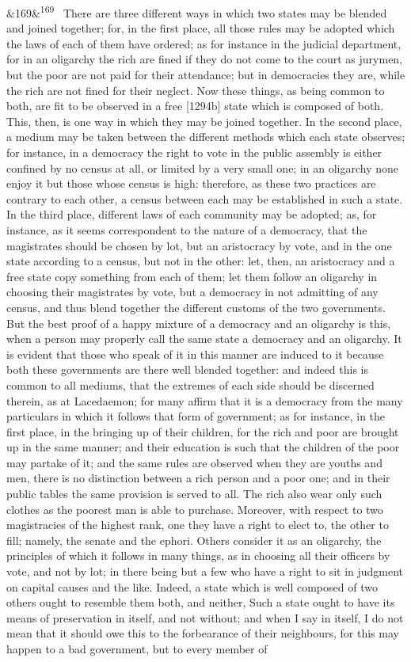 \documentclass[12pt]{article}
\newcommand{\para}[1][]{\par\noindent\ifx&#1&\else\textsuperscript{\footnotesize #1}~\fi}
\begin{document}
\para[169] There are three different ways in which two states may be blended and joined together; for, in the first place, all those rules may be adopted which the laws of each of them have ordered; as for instance in the judicial department, for in an oligarchy the rich are fined if they do not come to the court as jurymen, but the poor are not paid for their attendance; but in democracies they are, while the rich are not fined for their neglect. Now these things, as being common to both, are fit to be observed in a free [1294b] state which is composed of both. This, then, is one way in which they may be joined together. In the second place, a medium may be taken between the different methods which each state observes; for instance, in a democracy the right to vote in the public assembly is either confined by no census at all, or limited by a very small one; in an oligarchy none enjoy it but those whose census is high: therefore, as these two practices are contrary to each other, a census between each may be established in such a state. In the third place, different laws of each community may be adopted; as, for instance, as it seems correspondent to the nature of a democracy, that the magistrates should be chosen by lot, but an aristocracy by vote, and in the one state according to a census, but not in the other: let, then, an aristocracy and a free state copy something from each of them; let them follow an oligarchy in choosing their magistrates by vote, but a democracy in not admitting of any census, and thus blend together the different customs of the two governments. But the best proof of a happy mixture of a democracy and an oligarchy is this, when a person may properly call the same state a democracy and an oligarchy. It is evident that those who speak of it in this manner are induced to it because both these governments are there well blended together: and indeed this is common to all mediums, that the extremes of each side should be discerned therein, as at Lacedaemon; for many affirm that it is a democracy from the many particulars in which it follows that form of government; as for instance, in the first place, in the bringing up of their children, for the rich and poor are brought up in the same manner; and their education is such that the children of the poor may partake of it; and the same rules are observed when they are youths and men, there is no distinction between a rich person and a poor one; and in their public tables the same provision is served to all. The rich also wear only such clothes as the poorest man is able to purchase. Moreover, with respect to two magistracies of the highest rank, one they have a right to elect to, the other to fill; namely, the senate and the ephori. Others consider it as an oligarchy, the principles of which it follows in many things, as in choosing all their officers by vote, and not by lot; in there being but a few who have a right to sit in judgment on capital causes and the like. Indeed, a state which is well composed of two others ought to resemble them both, and neither, Such a state ought to have its means of preservation in itself, and not without; and when I say in itself, I do not mean that it should owe this to the forbearance of their neighbours, for this may happen to a bad government, but to every member of 
\end{document}
